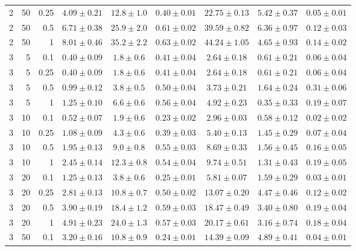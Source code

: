 \begin{table}[htbp]
\begin{tabular}{@{}rrrcccccc@{}}
2 & 50 & 0.25 & $4.09 \pm 0.21$ & $12.8 \pm 1.0$ & $0.40 \pm 0.01$ & $22.75 \pm 0.13$ & $5.42 \pm 0.37$ & $0.05 \pm 0.01$ \\
2 & 50 & 0.5 & $6.71 \pm 0.38$ & $25.9 \pm 2.0$ & $0.61 \pm 0.02$ & $39.59 \pm 0.82$ & $6.36 \pm 0.97$ & $0.12 \pm 0.03$ \\
2 & 50 & 1 & $8.01 \pm 0.46$ & $35.2 \pm 2.2$ & $0.63 \pm 0.02$ & $44.24 \pm 1.05$ & $4.65 \pm 0.93$ & $0.14 \pm 0.02$ \\
\midrule
3 & 5 & 0.1 & $0.40 \pm 0.09$ & $1.8 \pm 0.6$ & $0.41 \pm 0.04$ & $2.64 \pm 0.18$ & $0.61 \pm 0.21$ & $0.06 \pm 0.04$ \\
3 & 5 & 0.25 & $0.40 \pm 0.09$ & $1.8 \pm 0.6$ & $0.41 \pm 0.04$ & $2.64 \pm 0.18$ & $0.61 \pm 0.21$ & $0.06 \pm 0.04$ \\
3 & 5 & 0.5 & $0.99 \pm 0.12$ & $3.8 \pm 0.5$ & $0.50 \pm 0.04$ & $3.73 \pm 0.21$ & $1.64 \pm 0.24$ & $0.31 \pm 0.06$ \\
3 & 5 & 1 & $1.25 \pm 0.10$ & $6.6 \pm 0.6$ & $0.56 \pm 0.04$ & $4.92 \pm 0.23$ & $0.35 \pm 0.33$ & $0.19 \pm 0.07$ \\
3 & 10 & 0.1 & $0.52 \pm 0.07$ & $1.9 \pm 0.6$ & $0.23 \pm 0.02$ & $2.96 \pm 0.03$ & $0.58 \pm 0.12$ & $0.02 \pm 0.02$ \\
3 & 10 & 0.25 & $1.08 \pm 0.09$ & $4.3 \pm 0.6$ & $0.39 \pm 0.03$ & $5.40 \pm 0.13$ & $1.45 \pm 0.29$ & $0.07 \pm 0.04$ \\
3 & 10 & 0.5 & $1.95 \pm 0.13$ & $9.0 \pm 0.8$ & $0.55 \pm 0.03$ & $8.69 \pm 0.33$ & $1.56 \pm 0.45$ & $0.16 \pm 0.05$ \\
3 & 10 & 1 & $2.45 \pm 0.14$ & $12.3 \pm 0.8$ & $0.54 \pm 0.04$ & $9.74 \pm 0.51$ & $1.31 \pm 0.43$ & $0.19 \pm 0.05$ \\
3 & 20 & 0.1 & $1.25 \pm 0.13$ & $3.8 \pm 0.6$ & $0.25 \pm 0.01$ & $5.81 \pm 0.07$ & $1.59 \pm 0.29$ & $0.03 \pm 0.01$ \\
3 & 20 & 0.25 & $2.81 \pm 0.13$ & $10.8 \pm 0.7$ & $0.50 \pm 0.02$ & $13.07 \pm 0.20$ & $4.47 \pm 0.46$ & $0.12 \pm 0.02$ \\
3 & 20 & 0.5 & $3.90 \pm 0.19$ & $18.4 \pm 1.2$ & $0.59 \pm 0.03$ & $18.47 \pm 0.49$ & $3.40 \pm 0.80$ & $0.19 \pm 0.04$ \\
3 & 20 & 1 & $4.91 \pm 0.23$ & $24.0 \pm 1.3$ & $0.57 \pm 0.03$ & $20.17 \pm 0.61$ & $3.16 \pm 0.74$ & $0.18 \pm 0.04$ \\
3 & 50 & 0.1 & $3.20 \pm 0.16$ & $10.8 \pm 0.9$ & $0.24 \pm 0.01$ & $14.39 \pm 0.09$ & $4.89 \pm 0.41$ & $0.04 \pm 0.01$ \\

\end{tabular}
\end{table}
